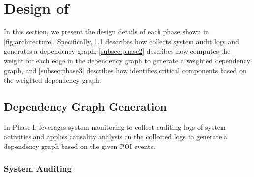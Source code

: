 \section{Design of \tool}
\label{sec:approach}


In this section, we present the design details of each phase shown in \cref{fig:architecture}.
Specifically, \cref{subsec:phase1} describes how \tool collects system audit logs and generates a dependency graph,
\cref{subsec:phase2} describes how \tool computes the weight for each edge in the dependency graph to generate a weighted dependency graph,
and \cref{subsec:phase3} describes how \tool identifies critical components based on the weighted dependency graph.




\subsection{Dependency Graph Generation}
\label{subsec:phase1}


In Phase I, \tool leverages system monitoring to collect auditing logs of system activities and applies causality analysis on the collected logs to generate a dependency graph based on the given POI events.



\subsubsection{System Auditing}
\label{subsubsec:system-auditing}

